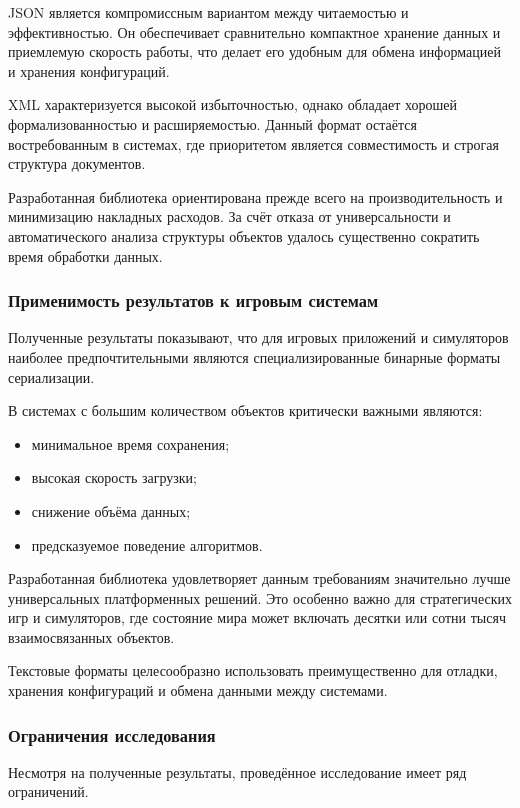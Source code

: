 \documentclass[coursework]{SCWorks}
\begin{document}
JSON является компромиссным вариантом между читаемостью и эффективностью. Он обеспечивает сравнительно компактное хранение данных и приемлемую скорость работы, что делает его удобным для обмена информацией и хранения конфигураций.

XML характеризуется высокой избыточностью, однако обладает хорошей формализованностью и расширяемостью. Данный формат остаётся востребованным в системах, где приоритетом является совместимость и строгая структура документов.

Разработанная библиотека ориентирована прежде всего на производительность и минимизацию накладных расходов. За счёт отказа от универсальности и автоматического анализа структуры объектов удалось существенно сократить время обработки данных.

\subsubsection{Применимость результатов к игровым системам}

Полученные результаты показывают, что для игровых приложений и симуляторов наиболее предпочтительными являются специализированные бинарные форматы сериализации.

В системах с большим количеством объектов критически важными являются:
\begin{itemize}
    \item минимальное время сохранения;
    \item высокая скорость загрузки;
    \item снижение объёма данных;
    \item предсказуемое поведение алгоритмов.
\end{itemize}

Разработанная библиотека удовлетворяет данным требованиям значительно лучше универсальных платформенных решений. Это особенно важно для стратегических игр и симуляторов, где состояние мира может включать десятки или сотни тысяч взаимосвязанных объектов.

Текстовые форматы целесообразно использовать преимущественно для отладки, хранения конфигураций и обмена данными между системами.

\subsubsection{Ограничения исследования}

Несмотря на полученные результаты, проведённое исследование имеет ряд ограничений.
\end{document}
